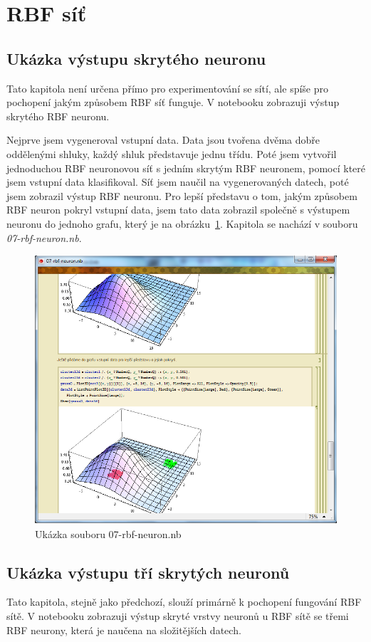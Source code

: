 \documentclass[11pt,twoside,a4paper]{book}
\begin{document}
\section{RBF síť}
\subsection{Ukázka výstupu skrytého neuronu}
Tato kapitola není určena přímo pro experimentování se sítí, ale spíše pro pochopení jakým způsobem RBF síť funguje. V notebooku zobrazuji výstup skrytého RBF neuronu.

Nejprve jsem vygeneroval vstupní data. Data jsou tvořena dvěma dobře oddělenými shluky, každý shluk představuje jednu třídu. Poté jsem vytvořil jednoduchou RBF neuronovou síť s jedním skrytým RBF neuronem, pomocí které jsem vstupní data klasifikoval. Síť jsem naučil na vygenerovaných datech, poté jsem zobrazil výstup RBF neuronu. Pro lepší představu o tom, jakým způsobem RBF neuron pokryl vstupní data, jsem tato data zobrazil společně s výstupem neuronu do jednoho grafu, který je na obrázku~\ref{fig:rbf-neuron}. Kapitola se nachází v souboru \textit{07-rbf-neuron.nb}.

\begin{figure}[h!]
\begin{center}
\includegraphics[height=10cm]{figures/ukazka07.png}
\caption{Ukázka souboru 07-rbf-neuron.nb}
\label{fig:rbf-neuron}
\end{center}
\end{figure}

\subsection{Ukázka výstupu tří skrytých neuronů}
Tato kapitola, stejně jako předchozí, slouží primárně k pochopení fungování RBF sítě. V notebooku zobrazuji výstup skryté vrstvy neuronů u RBF sítě se třemi RBF neurony, která je naučena na složitějších datech. 
\end{document}
